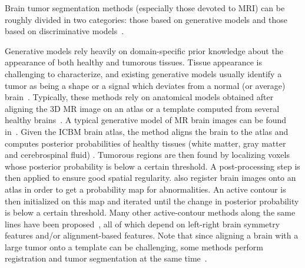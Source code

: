 \documentclass[final,5p,times,twocolumn]{elsarticle}
\begin{document}
Brain tumor segmentation methods (especially those devoted to MRI) can be roughly divided in two categories: those based on generative models and those based on discriminative models~\citep{Menze2014,Bauer2013,Angelini2007}.%

Generative models rely heavily on domain-specific prior knowledge about the appearance of both healthy and tumorous tissues. Tissue appearance is challenging to characterize, and existing generative models usually identify a tumor as being a shape or a signal which deviates from a normal (or average) brain~\citep{Clark1998}. Typically, these methods rely on anatomical models obtained after aligning the 3D MR image on an atlas or a template computed from several healthy brains~\citep{Doyle2013}. A typical generative model of MR brain images can be found in~\citet{Prastawa2004}. Given the ICBM brain atlas, the method aligns the brain to the atlas and computes posterior probabilities of healthy tissues (white matter, gray matter and cerebrospinal fluid) . Tumorous regions are then found by localizing voxels whose posterior probability is below a certain threshold. %
A post-processing step is then applied to ensure good spatial regularity. \citet{prastawa2003b} also register brain images onto an atlas in order to get a probability map for abnormalities.  An active contour %
is then initialized on this map and iterated until the change in posterior probability is below a certain threshold. Many other active-contour methods along the same lines have been proposed~\citep{Khotanlou2009,Cobzas2007,Popuri2012}, all of which depend on left-right brain symmetry features and/or alignment-based features.  
%
Note that since aligning a brain with a large tumor onto a template can be challenging, some methods perform registration and tumor segmentation at the same time~\citep{Kwon2014,Parisot2012}.

%
\end{document}
